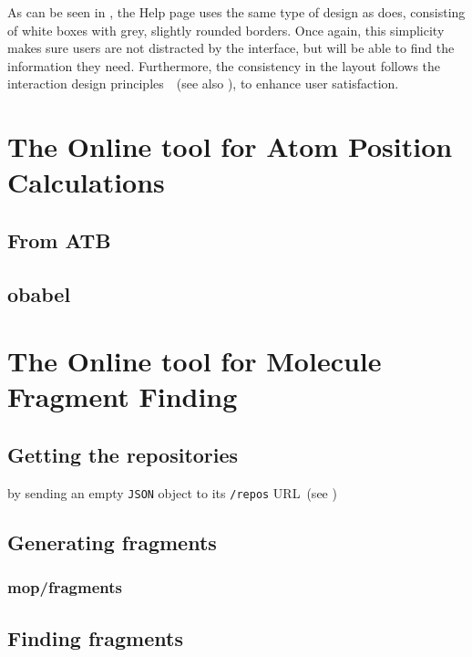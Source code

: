 As can be seen in , the Help page uses the same type of design as \oframp{} does, consisting of white boxes with grey, slightly rounded borders. Once again, this simplicity makes sure users are not distracted by the interface, but will be able to find the information they need. Furthermore, the consistency in the layout follows the interaction design principles~\cite{norman2010gestural,blair2008user}~(see also ), to enhance user satisfaction.


\section[\oapoc]{The Online tool for Atom Position Calculations}
\nlipsum

\subsection{From ATB}
\nlipsum

\subsection{obabel}
\nlipsum


\section[\omfraf]{The Online tool for Molecule Fragment Finding}
\nlipsum

\subsection{Getting the repositories}
 by sending an empty \verb|JSON| object to its \verb|/repos| URL~(see )
\nlipsum

\subsection{Generating fragments}
\nlipsum

\subsubsection{mop/fragments}
\nlipsum

\subsection{Finding fragments}
\nlipsum
